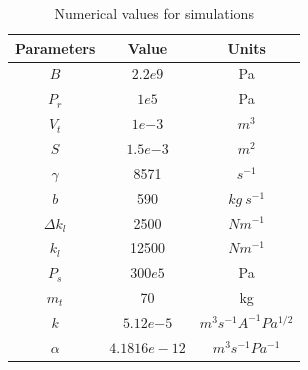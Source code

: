 \documentclass{article} %
\begin{document}
\begin{table}[h]
\setlength{\tabcolsep}{1pt}
\caption{Numerical values for simulations} %
\centering %
\small
\begin{tabular}{c c c} %
\hline\hline %
Parameters & Value & Units \\ [0.5ex]
\hline\hline %
$B$ & $2.2e9$ & Pa \\[1ex] %
$P_r$ & $1e5$ & Pa\\[1ex] %
$V_t$ & $1e{-3}$ & $m^3$ \\[1ex]
$S$ & $1.5e{-3}$ & $m^2$ \\[1ex]
$\gamma$ & 8571 & $s^{-1}$ \\[1ex]
$b$ & 590 & $kg~s^{-1}$ \\[1ex]
$\Delta$$k_l$ & 2500 & $N m^{-1}$ \\[1ex]
 $k_l$ & 12500 & $N m^{-1}$ \\[1ex]
$P_s$ & $300e5$ & Pa \\[1ex]
 $m_t$ & 70 & kg\\[1ex]
$k$ & $5.12e{-5}$ & $m^3 s^{-1} A^{-1} Pa^{1/2}$ \\[1ex]
$\alpha$ & $4.1816e-12$ & $m^3 s^{-1} Pa^{-1}$ \\[1ex]
\hline\hline %
\end{tabular}
\label{table:Table2} %
\end{table}
\end{document}
